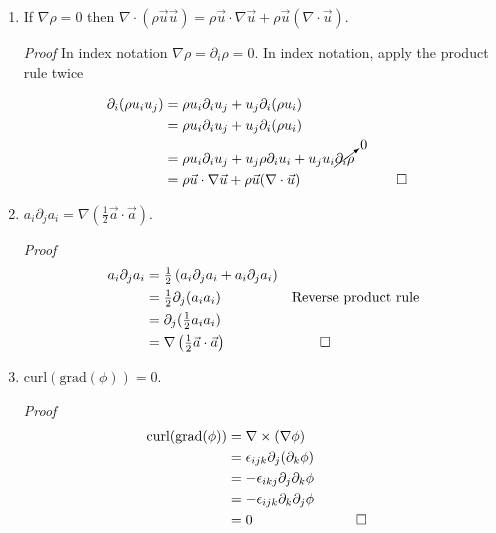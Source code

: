 \documentclass[11pt,twoside]{article}
\renewcommand{\d}{\partial}
\newcommand{\vect}[1]{\vec{#1}}
\newcommand{\grad}{\nabla}
\newcommand{\cross}{\times}
\newcommand{\curl}{\mbox{curl}}
\newcommand{\gradf}{\mbox{grad}}
\newcommand{\inline}[1]{\mbox{$#1$}}
\begin{document}
\begin{enumerate}
%
%
\item If $\nabla\rho=0 $ then $ \nabla\cdot(\rho\vect{u}\vect{u}) = \rho\vect{u}\cdot\nabla\vect{u} + \rho\vect{u}(\nabla\cdot\vect{u})$.

\textit{Proof} In index notation $\nabla\rho=\d_i\rho = 0$. In index notation, apply the product rule twice

\begin{align*}
\d_i(\rho u_iu_j) &= \rho u_i\d_i u_j +u_j\d_i(\rho u_i)\\
&= \rho u_i\d_i u_j +u_j\d_i(\rho u_i)\\
&= \rho u_i\d_i u_j +u_j\rho\d_i u_i + u_ju_i\cancelto{0}{\d_i\rho}&&\\
& = \rho\vect{u}\cdot\nabla\vect{u} + \rho\vect{u}(\nabla\cdot\vect{u})&&\qed
\end{align*}




%
%
\item $a_i\d_ja_i=\grad(\frac{1}{2}\vect{a}\cdot\vect{a})$. 

\textit{Proof} 
\begin{align*}
a_i\d_ja_i &= \inline{\frac{1}{2}}\left(a_i\d_ja_i + a_i\d_ja_i\right) && \\
           &= \inline{\frac{1}{2}}\d_j(a_ia_i) &&\text{Reverse product rule} \\
           &= \d_j(\inline{\frac{1}{2}}a_ia_i) &&\\
           &= \grad\left(\inline{\frac{1}{2}}\vect{a}\cdot\vect{a}\right) &&\qed
\end{align*}

\newpage
%
%
\item $\curl(\gradf(\phi)) = 0$. 

\textit{Proof} 
\begin{align*}
\curl(\gradf(\phi)) & = \grad\cross(\grad\phi)\\
                    & = \epsilon_{ijk}\d_j(\d_k\phi)\\
                    & = - \epsilon_{ikj}\d_j\d_k\phi\\
                    & = - \epsilon_{ijk}\d_k\d_j\phi\\
                    & = 0 && \qed
\end{align*}


\end{enumerate}
\end{document}
